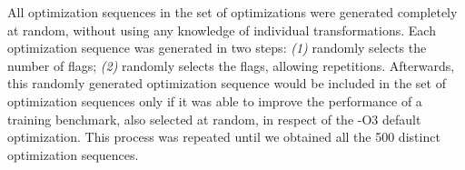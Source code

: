 
All optimization sequences in the set of optimizations were generated completely at random, without using any knowledge of individual transformations.
Each optimization sequence was generated in two steps: \textit{(1)} randomly selects the number of flags; \textit{(2)} randomly selects the flags, allowing repetitions.
Afterwards, this randomly generated optimization sequence would be included in the set of optimization sequences only if it was able to improve the performance of a training benchmark, also selected at random, in respect of the {\flagstype -O3} default optimization.
This process was repeated until we obtained all the 500 distinct optimization sequences.
